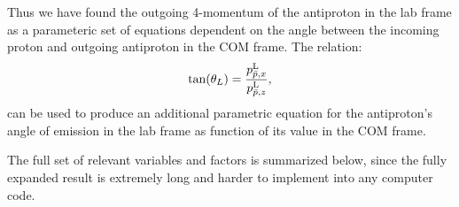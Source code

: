 Thus we have found the outgoing 4-momentum of the antiproton in the lab frame as a parameteric set of equations dependent on the angle between the incoming proton and outgoing antiproton in the \ac{COM} frame.
The relation:
\begin{align}
\tan(\theta_L)=\frac{p^{\textrm{L}}_{\bar{p},x}}{p^{\textrm{L}}_{\bar{p},z}},
\end{align}
can be used to produce an additional parametric equation for the antiproton's angle of emission in the lab frame as function of its value in the COM frame.

The full set of relevant variables and factors is summarized below, since the fully expanded result is extremely long and harder to implement into any computer code.

%
